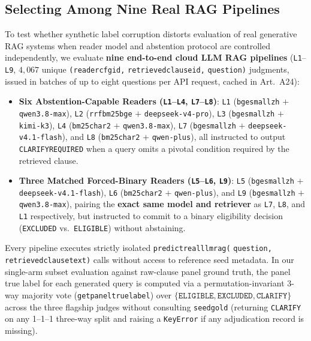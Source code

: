 \documentclass[10pt,twocolumn]{article}
\renewcommand{\_}{\textunderscore\allowbreak}
\begin{document}
\subsection{Selecting Among Nine Real RAG Pipelines}
To test whether synthetic label corruption distorts evaluation of real generative RAG systems when reader model and abstention protocol are controlled independently, we evaluate \textbf{nine end-to-end cloud LLM RAG pipelines} (\texttt{L1}--\texttt{L9}, $4{,}067$ unique \texttt{(reader\_cfg\_id,} \allowbreak \texttt{retrieved\_clause\_id,} \allowbreak \texttt{question)} judgments, issued in batches of up to eight questions per API request, cached in Art.~A24):
\begin{itemize}[leftmargin=*,nosep]
  \item \textbf{Six Abstention-Capable Readers (\texttt{L1}--\texttt{L4}, \texttt{L7}--\texttt{L8})}: \texttt{L1} (\texttt{bge\_small\_zh} $+$ \texttt{qwen3.8-max}), \texttt{L2} (\texttt{rrf\_bm25\_bge} $+$ \texttt{deepseek-v4-pro}), \texttt{L3} (\texttt{bge\_small\_zh} $+$ \texttt{kimi-k3}), \texttt{L4} (\texttt{bm25\_char2} $+$ \texttt{qwen3.8-max}), \texttt{L7} (\texttt{bge\_small\_zh} $+$ \texttt{deepseek-v4.1-flash}), and \texttt{L8} (\texttt{bm25\_char2} $+$ \texttt{qwen-plus}), all instructed to output \texttt{CLARIFY\_REQUIRED} when a query omits a pivotal condition required by the retrieved clause.
  \item \textbf{Three Matched Forced-Binary Readers (\texttt{L5}--\texttt{L6}, \texttt{L9})}: \texttt{L5} (\texttt{bge\_small\_zh} $+$ \texttt{deepseek-v4.1-flash}), \texttt{L6} (\texttt{bm25\_char2} $+$ \texttt{qwen-plus}), and \texttt{L9} (\texttt{bge\_small\_zh} $+$ \texttt{qwen3.8-max}), pairing the \textbf{exact same model and retriever} as \texttt{L7}, \texttt{L8}, and \texttt{L1} respectively, but instructed to commit to a binary eligibility decision (\texttt{EXCLUDED} vs.\ \texttt{ELIGIBLE}) without abstaining.
\end{itemize}
Every pipeline executes strictly isolated \texttt{predict\_real\_llm\_rag(} \allowbreak \texttt{question,} \allowbreak \texttt{retrieved\_clause\_text)} calls without access to reference seed metadata. In our single-arm subset evaluation against raw-clause panel ground truth, the panel true label for each generated query is computed via a permutation-invariant 3-way majority vote (\texttt{\_get\_panel\_true\_label}) over $\{\texttt{ELIGIBLE}, \texttt{EXCLUDED}, \texttt{CLARIFY}\}$ across the three flagship judges without consulting \texttt{seed\_gold} (returning \texttt{CLARIFY} on any 1--1--1 three-way split and raising a \texttt{KeyError} if any adjudication record is missing).
\end{document}
